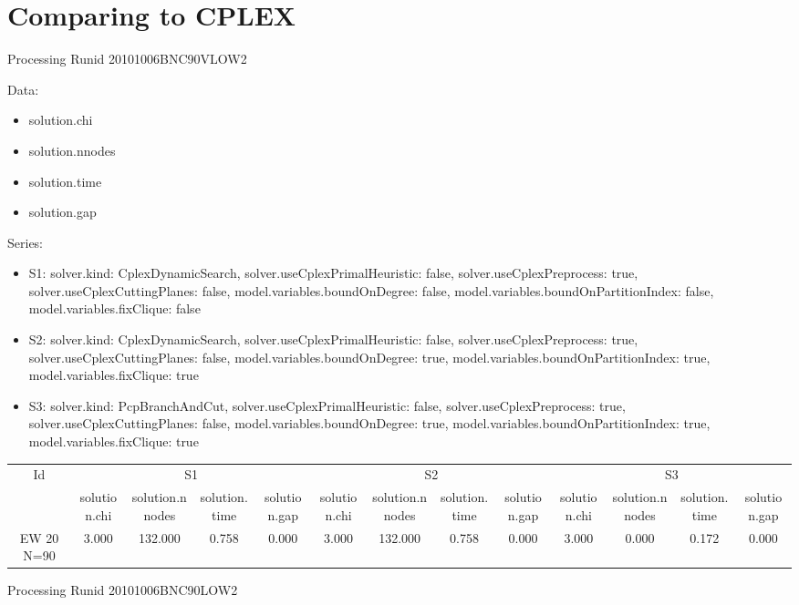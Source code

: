 \documentclass[landscape, 12pt]{report}
\begin{document}
\clearpage

\section{Comparing to CPLEX}

Processing Runid 20101006BNC90VLOW2

Data:
\begin{itemize}
\item solution.chi
\item solution.nnodes
\item solution.time
\item solution.gap
\end{itemize}
Series:
\begin{itemize}
\item S1: solver.kind: CplexDynamicSearch, solver.useCplexPrimalHeuristic: false, solver.useCplexPreprocess: true, solver.useCplexCuttingPlanes: false, model.variables.boundOnDegree: false, model.variables.boundOnPartitionIndex: false, model.variables.fixClique: false
\item S2: solver.kind: CplexDynamicSearch, solver.useCplexPrimalHeuristic: false, solver.useCplexPreprocess: true, solver.useCplexCuttingPlanes: false, model.variables.boundOnDegree: true, model.variables.boundOnPartitionIndex: true, model.variables.fixClique: true
\item S3: solver.kind: PcpBranchAndCut, solver.useCplexPrimalHeuristic: false, solver.useCplexPreprocess: true, solver.useCplexCuttingPlanes: false, model.variables.boundOnDegree: true, model.variables.boundOnPartitionIndex: true, model.variables.fixClique: true
\end{itemize}
\begin{tabular}{|c|cccc|cccc|cccc|}
\hline
\multicolumn{1}{|c|}{Id} & \multicolumn{4}{|c|}{S1} & \multicolumn{4}{|c|}{S2} & \multicolumn{4}{|c|}{S3}
\\
 & solution.chi & solution.nnodes & solution.time & solution.gap & solution.chi & solution.nnodes & solution.time & solution.gap & solution.chi & solution.nnodes & solution.time & solution.gap
\\
\hline
EW 20 N=90 & 3.000 & 132.000 & 0.758 & 0.000 & 3.000 & 132.000 & 0.758 & 0.000 & 3.000 & 0.000 & 0.172 & 0.000
\\
\hline 
 \end{tabular}


Processing Runid 20101006BNC90LOW2
\end{document}

